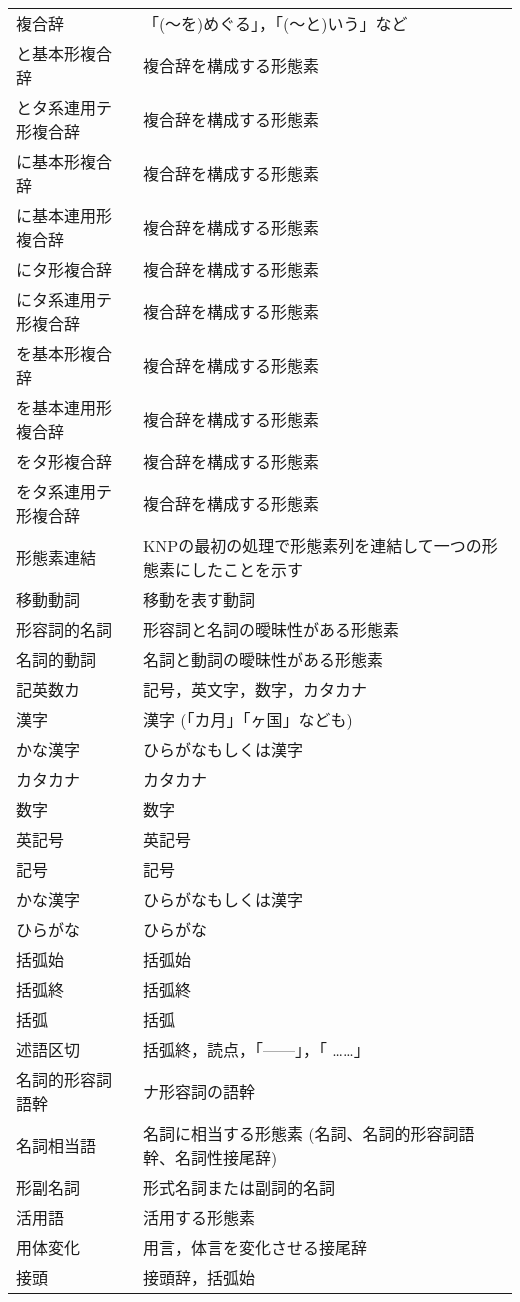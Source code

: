 \documentclass[a4j]{jarticle}
\begin{document}
\begin{supertabular}{p{4.2cm}p{9.6cm}}
複合辞 & 「(〜を)めぐる」，「(〜と)いう」など\\
と基本形複合辞 & 複合辞を構成する形態素\\
とタ系連用テ形複合辞 & 複合辞を構成する形態素\\
に基本形複合辞 & 複合辞を構成する形態素\\
に基本連用形複合辞 & 複合辞を構成する形態素\\
にタ形複合辞 & 複合辞を構成する形態素\\
にタ系連用テ形複合辞 & 複合辞を構成する形態素\\
を基本形複合辞 & 複合辞を構成する形態素\\
を基本連用形複合辞 & 複合辞を構成する形態素\\
をタ形複合辞 & 複合辞を構成する形態素\\
をタ系連用テ形複合辞 & 複合辞を構成する形態素\\
形態素連結 & KNPの最初の処理で形態素列を連結して一つの形態素にしたことを示す \\
移動動詞 & 移動を表す動詞 \\
形容詞的名詞 & 形容詞と名詞の曖昧性がある形態素 \\
名詞的動詞 & 名詞と動詞の曖昧性がある形態素 \\
記英数カ & 記号，英文字，数字，カタカナ \\
漢字 & 漢字 (「カ月」「ヶ国」なども)\\
かな漢字 & ひらがなもしくは漢字\\
カタカナ & カタカナ\\
数字 & 数字\\
英記号 & 英記号\\
記号 & 記号\\
かな漢字 & ひらがなもしくは漢字\\
ひらがな & ひらがな\\
括弧始 & 括弧始 \\
括弧終 & 括弧終 \\
括弧 & 括弧 \\
述語区切 & 括弧終，読点，「——」，「 ……」\\
名詞的形容詞語幹 & ナ形容詞の語幹\\
名詞相当語 & 名詞に相当する形態素 (名詞、名詞的形容詞語幹、名詞性接尾辞) \\
形副名詞 & 形式名詞または副詞的名詞\\
活用語 & 活用する形態素\\
用体変化 & 用言，体言を変化させる接尾辞\\
接頭 & 接頭辞，括弧始\\

\end{supertabular}
\end{document}
